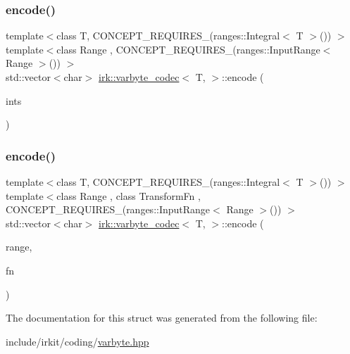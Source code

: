 \subsubsection{\texorpdfstring{encode()}{encode()}\hspace{0.1cm}{\footnotesize\ttfamily [2/3]}}
{\footnotesize\ttfamily template$<$class T, C\+O\+N\+C\+E\+P\+T\+\_\+\+R\+E\+Q\+U\+I\+R\+E\+S\+\_\+(ranges\+::\+Integral$<$ T $>$()) $>$ \\
template$<$class Range , C\+O\+N\+C\+E\+P\+T\+\_\+\+R\+E\+Q\+U\+I\+R\+E\+S\+\_\+(ranges\+::\+Input\+Range$<$ Range $>$()) $>$ \\
std\+::vector$<$char$>$ \mbox{\hyperlink{structirk_1_1varbyte__codec}{irk\+::varbyte\+\_\+codec}}$<$ T, $>$\+::encode (\begin{DoxyParamCaption}\item[{const Range \&}]{ints }\end{DoxyParamCaption})\hspace{0.3cm}{\ttfamily [inline]}}

\mbox{\label{structirk_1_1varbyte__codec_abf78b8a557eccd238fd4c3d7f381dd12}} 
\subsubsection{\texorpdfstring{encode()}{encode()}\hspace{0.1cm}{\footnotesize\ttfamily [3/3]}}
{\footnotesize\ttfamily template$<$class T, C\+O\+N\+C\+E\+P\+T\+\_\+\+R\+E\+Q\+U\+I\+R\+E\+S\+\_\+(ranges\+::\+Integral$<$ T $>$()) $>$ \\
template$<$class Range , class Transform\+Fn , C\+O\+N\+C\+E\+P\+T\+\_\+\+R\+E\+Q\+U\+I\+R\+E\+S\+\_\+(ranges\+::\+Input\+Range$<$ Range $>$()) $>$ \\
std\+::vector$<$char$>$ \mbox{\hyperlink{structirk_1_1varbyte__codec}{irk\+::varbyte\+\_\+codec}}$<$ T, $>$\+::encode (\begin{DoxyParamCaption}\item[{const Range \&}]{range,  }\item[{Transform\+Fn}]{fn }\end{DoxyParamCaption})\hspace{0.3cm}{\ttfamily [inline]}}



The documentation for this struct was generated from the following file\+:\begin{DoxyCompactItemize}
\item 
include/irkit/coding/\mbox{\hyperlink{varbyte_8hpp}{varbyte.\+hpp}}\end{DoxyCompactItemize}
